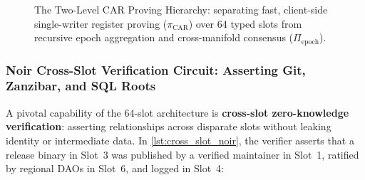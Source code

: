 \documentclass[a4paper,11pt,twoside,parskip=half-,headings=small]{scrartcl}
\begin{document}
\begin{figure}[H]
\caption{The Two-Level CAR Proving Hierarchy: separating fast, client-side single-writer register proving ($\pi_{\text{CAR}}$) over 64 typed slots from recursive epoch aggregation and cross-manifold consensus ($\Pi_{\text{epoch}}$).}
\label{fig:car_proving_hierarchy}
\end{figure}

\clearpage
\subsubsection{Noir Cross-Slot Verification Circuit: Asserting Git, Zanzibar, and SQL Roots}

A pivotal capability of the 64-slot architecture is \textbf{cross-slot zero-knowledge verification}: asserting relationships across disparate slots without leaking identity or intermediate data. In \cref{lst:cross_slot_noir}, the verifier asserts that a release binary in Slot~3 was published by a verified maintainer in Slot~1, ratified by regional DAOs in Slot~6, and logged in Slot~4:
\end{document}
